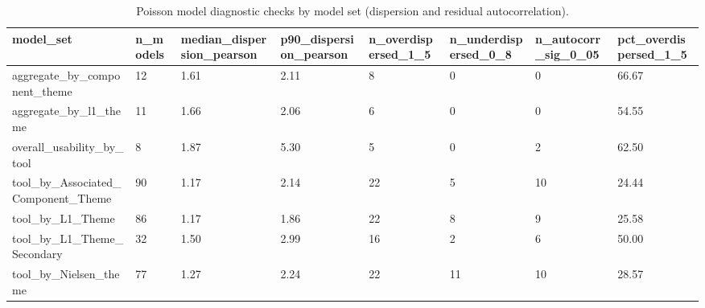 \begin{table}[t]
\centering
\caption{Poisson model diagnostic checks by model set (dispersion and residual autocorrelation).}
\label{tab:poisson-diagnostics-summary}
\scriptsize
\begin{tabular}{llllllll}
\hline
model\_set & n\_models & median\_dispersion\_pearson & p90\_dispersion\_pearson & n\_overdispersed\_1\_5 & n\_underdispersed\_0\_8 & n\_autocorr\_sig\_0\_05 & pct\_overdispersed\_1\_5 \\
\hline
aggregate\_by\_component\_theme & 12 & 1.61 & 2.11 & 8 & 0 & 0 & 66.67 \\
aggregate\_by\_l1\_theme & 11 & 1.66 & 2.06 & 6 & 0 & 0 & 54.55 \\
overall\_usability\_by\_tool & 8 & 1.87 & 5.30 & 5 & 0 & 2 & 62.50 \\
tool\_by\_Associated\_Component\_Theme & 90 & 1.17 & 2.14 & 22 & 5 & 10 & 24.44 \\
tool\_by\_L1\_Theme & 86 & 1.17 & 1.86 & 22 & 8 & 9 & 25.58 \\
tool\_by\_L1\_Theme\_Secondary & 32 & 1.50 & 2.99 & 16 & 2 & 6 & 50.00 \\
tool\_by\_Nielsen\_theme & 77 & 1.27 & 2.24 & 22 & 11 & 10 & 28.57 \\
\hline
\end{tabular}
\end{table}
